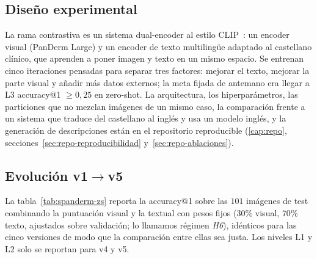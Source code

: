 \subsection{Diseño experimental}

La rama contrastiva es un sistema dual-encoder al estilo
CLIP~\cite{clip2021}: un encoder visual (PanDerm Large) y un encoder de
texto multilingüe adaptado al castellano clínico, que aprenden a poner
imagen y texto en un mismo espacio. Se entrenan cinco iteraciones
pensadas para separar tres factores: mejorar el texto, mejorar la parte
visual y añadir más datos externos; la meta fijada de antemano era
llegar a L3 accuracy@1 $\geq 0{,}25$ en zero-shot. La arquitectura, los
hiperparámetros, las particiones que no mezclan imágenes de un mismo
caso, la comparación frente a un sistema que traduce del castellano al
inglés y usa un modelo inglés, y la generación de descripciones están
en el repositorio reproducible (\ref{cap:repo},
secciones~\ref{sec:repo-reproducibilidad} y~\ref{sec:repo-ablaciones}).

\subsection{Evolución v1$\to$v5}

La tabla~\ref{tab:spanderm-zs} reporta la accuracy@1 sobre las
$101$ imágenes de test combinando la puntuación visual y la textual con
pesos fijos ($30\%$ visual, $70\%$ texto, ajustados sobre validación; lo
llamamos régimen \emph{H6}), idénticos para las cinco versiones de modo
que la comparación entre ellas sea justa. Los niveles L1 y L2 solo se
reportan para v4 y v5.

